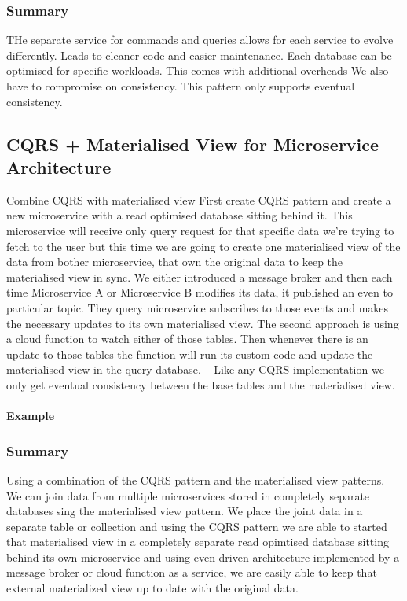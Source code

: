 \subsubsection{Summary}
THe separate service for commands and queries allows for each service to evolve differently.
Leads to cleaner code and easier maintenance.
Each database can be optimised for specific workloads.
This comes with additional overheads
We also have to compromise on consistency.
This pattern only supports eventual consistency.

\subsection{CQRS + Materialised View for Microservice Architecture}
Combine CQRS with materialised view
First create CQRS pattern and create a new microservice with a read optimised database sitting behind it.
This microservice will receive only query request for that specific data we're trying to fetch to the user but this time we are going to create one materialised view of the data from bother microservice, that own the original data to keep the materialised view in sync.
We either introduced a message broker and then each time Microservice A or Microservice B modifies its data, it published an even to particular topic.
They query microservice subscribes to those events and makes the necessary updates to its own materialised view.
The second approach is using a cloud function to watch either of those tables.
Then whenever there is an update to those tables the function will run its custom code and update the materialised view in the query database.
-- Like any CQRS implementation we only get eventual consistency between the base tables and the materialised view.

\paragraph{Example}

\subsubsection{Summary}
Using a combination of the CQRS pattern and the materialised view patterns.
We can join data from multiple microservices stored in completely separate databases sing the materialised view pattern.
We place the joint data in a separate table or collection and using the CQRS pattern we are able to started that materialised view in a completely separate read opimtised database sitting behind its own microservice and using even driven architecture implemented by a message broker or cloud function as a service, we are easily able to keep that external materialized view up to date with the original data.

